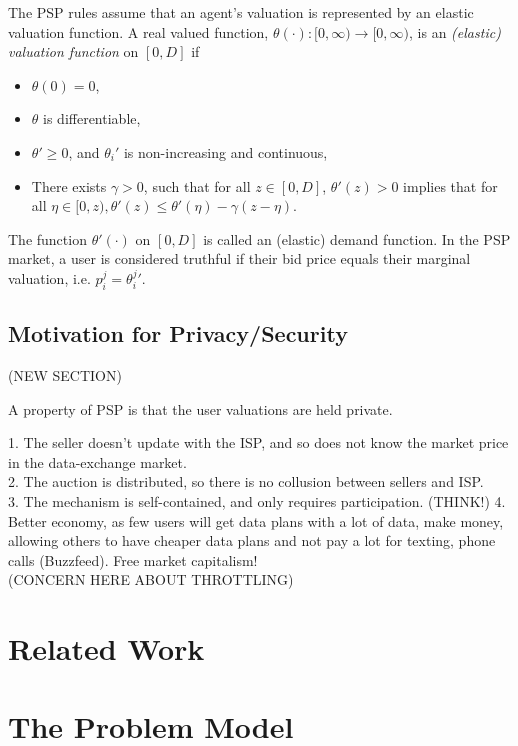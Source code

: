 \documentclass[sigconf, anonymous]{acmart}
\theoremstyle{definition}
\begin{document}
The PSP rules assume that an agent's valuation is represented by an elastic valuation function.
A real valued function, $\theta(\cdot): [0,\infty) \rightarrow [0,\infty)$, is an \emph{(elastic) valuation
function} on $[0, D]$ if 
\begin{itemize}
    \item $\theta(0) = 0$,
    \item $\theta$ is differentiable,
    \item ${\theta}' \ge 0$, and ${\theta_i}'$ is non-increasing and continuous,
     \item There exists $\gamma > 0$, such that for all $z \in [0,D]$,
${\theta}'(z) > 0$ implies that for all $\eta \in [0, z), {\theta}'(z) \le
{\theta}'(\eta)
- \gamma(z - \eta)$. 
\end{itemize}
The function $\theta'(\cdot)$ on $[0, D]$ is called an (elastic) demand
function.
In the PSP market, a
user is considered truthful if their bid price equals their marginal valuation,
i.e. $p_i^j = {\theta_i^j}'$.

\subsection{Motivation for Privacy/Security}(NEW SECTION)

A property of PSP is that the user valuations are held private. 

1. The seller doesn't update with the ISP, and so does not know the market price
 in the data-exchange market.\\
2. The auction is distributed, so there is no collusion between sellers and
ISP.\\
3. The mechanism is self-contained, and only requires participation. (THINK!)
4. Better economy, as few users will get data plans with a lot of data, make
money, allowing others to have cheaper data plans and not pay a lot for
texting, phone calls (Buzzfeed). Free market capitalism! \\
(CONCERN HERE ABOUT THROTTLING)

\section{Related Work}

\section{The Problem Model}
\end{document}
